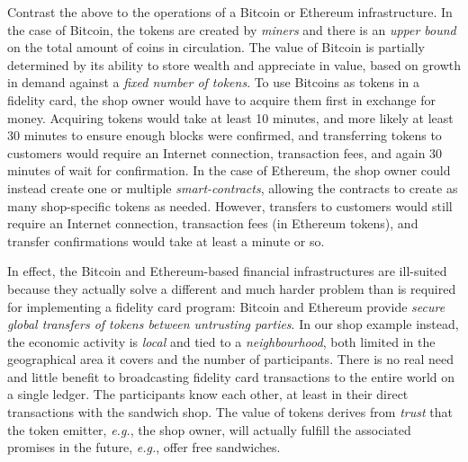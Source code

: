 \documentclass[sigplan,screen,10pt,review,anonymous]{acmart}
\begin{document}
Contrast the above to the operations of a Bitcoin or Ethereum infrastructure. In the case of Bitcoin, the tokens are created by \textit{miners} and there is an \textit{upper bound} on the total amount of coins in circulation. 
The value of Bitcoin is partially determined by its ability to store wealth and appreciate in value, based on growth in demand against a \textit{fixed number of tokens}. To use Bitcoins as tokens in a fidelity card, the shop owner would have to acquire them first in exchange for money. Acquiring tokens would take at least 10 minutes, and more likely at least 30 minutes to ensure enough blocks were confirmed, and transferring tokens to customers would require an Internet connection, transaction fees, and again 30 minutes of wait for confirmation. In the case of Ethereum, the shop owner could instead create one or multiple \textit{smart-contracts}, allowing the contracts to create as many shop-specific tokens as needed. However, transfers to customers would still require an Internet connection, transaction fees (in Ethereum tokens), and transfer confirmations would take at least a minute or so. %

In effect, the Bitcoin and Ethereum-based financial infrastructures are ill-suited because they actually solve a different and much harder problem than is required for implementing a fidelity card program: Bitcoin and Ethereum provide \textit{secure global transfers of tokens between untrusting parties}. In our shop example instead, the economic activity is \textit{local} and tied to a \textit{neighbourhood}, both limited in the geographical area it covers and the number of participants. There is no real need and little benefit to broadcasting fidelity card transactions to the entire world on a single ledger. The participants know each other, at least in their direct transactions with the sandwich shop. The value of tokens derives from \textit{trust} that the token emitter, \textit{e.g.}, the shop owner, will actually fulfill the associated promises in the future, \textit{e.g.}, offer free sandwiches. 
\end{document}
